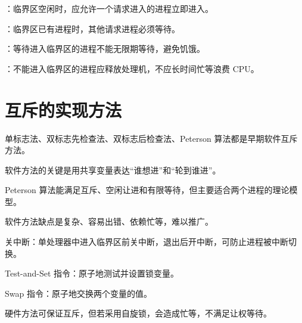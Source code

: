 \begin{points}
  \item {}：临界区空闲时，应允许一个请求进入的进程立即进入。
  \item {}：临界区已有进程时，其他请求进程必须等待。
  \item {}：等待进入临界区的进程不能无限期等待，避免饥饿。
  \item {}：不能进入临界区的进程应释放处理机，不应长时间忙等浪费 CPU。
\end{points}

\section{互斥的实现方法}
\begin{points}
  \item 单标志法、双标志先检查法、双标志后检查法、Peterson 算法都是早期软件互斥方法。
  \item 软件方法的关键是用共享变量表达“谁想进”和“轮到谁进”。
  \item Peterson 算法能满足互斥、空闲让进和有限等待，但主要适合两个进程的理论模型。
  \item 软件方法缺点是复杂、容易出错、依赖忙等，难以推广。
\end{points}


\begin{points}
  \item 关中断：单处理器中进入临界区前关中断，退出后开中断，可防止进程被中断切换。
  \item Test-and-Set 指令：原子地测试并设置锁变量。
  \item Swap 指令：原子地交换两个变量的值。
  \item 硬件方法可保证互斥，但若采用自旋锁，会造成忙等，不满足让权等待。
\end{points}


